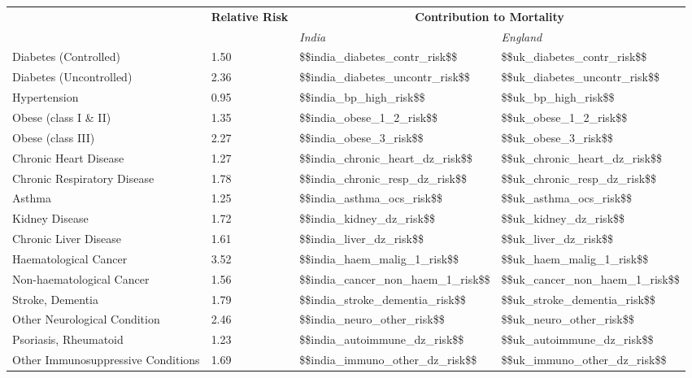 \begin{tabular}{p{6cm}p{1.5cm}p{2cm}p{2cm}}
& \textbf{Relative \newline Risk} & \multicolumn{2}{c}{\textbf{Contribution to Mortality}} \\[-1.5ex]
& & \emph{India} & \emph{England} \\[2ex]
Diabetes (Controlled) & 1.50 & \num{$$india_diabetes_contr_risk$$} & \num{$$uk_diabetes_contr_risk$$} \\[0.25ex]
Diabetes (Uncontrolled) & 2.36 & \num{$$india_diabetes_uncontr_risk$$} & \num{$$uk_diabetes_uncontr_risk$$} \\[0.25ex]
Hypertension & 0.95 & \num{$$india_bp_high_risk$$} & \num{$$uk_bp_high_risk$$} \\[0.25ex]
Obese (class I \& II) & 1.35 & \num{$$india_obese_1_2_risk$$} & \num{$$uk_obese_1_2_risk$$} \\[0.25ex]
Obese (class III) & 2.27 & \num{$$india_obese_3_risk$$} & \num{$$uk_obese_3_risk$$} \\[0.25ex]
Chronic Heart Disease & 1.27 & \num{$$india_chronic_heart_dz_risk$$} & \num{$$uk_chronic_heart_dz_risk$$} \\[0.25ex]
Chronic Respiratory Disease & 1.78 & \num{$$india_chronic_resp_dz_risk$$} & \num{$$uk_chronic_resp_dz_risk$$} \\[0.25ex]
Asthma & 1.25 & \num{$$india_asthma_ocs_risk$$} & \num{$$uk_asthma_ocs_risk$$} \\[0.25ex]
Kidney Disease & 1.72 & \num{$$india_kidney_dz_risk$$} & \num{$$uk_kidney_dz_risk$$} \\[0.25ex]
Chronic Liver Disease & 1.61 & \num{$$india_liver_dz_risk$$} & \num{$$uk_liver_dz_risk$$} \\[0.25ex]
Haematological Cancer & 3.52 & \num{$$india_haem_malig_1_risk$$} & \num{$$uk_haem_malig_1_risk$$} \\[0.25ex]
Non-haematological Cancer & 1.56 & \num{$$india_cancer_non_haem_1_risk$$} & \num{$$uk_cancer_non_haem_1_risk$$} \\[0.25ex]
Stroke, Dementia & 1.79 & \num{$$india_stroke_dementia_risk$$} & \num{$$uk_stroke_dementia_risk$$} \\[0.25ex]
Other Neurological Condition & 2.46 & \num{$$india_neuro_other_risk$$} & \num{$$uk_neuro_other_risk$$} \\[0.25ex]
Psoriasis, Rheumatoid & 1.23 & \num{$$india_autoimmune_dz_risk$$} & \num{$$uk_autoimmune_dz_risk$$} \\[0.25ex]
Other Immunosuppressive Conditions & 1.69 & \num{$$india_immuno_other_dz_risk$$} & \num{$$uk_immuno_other_dz_risk$$} \\[0.25ex]
\end{tabular}

